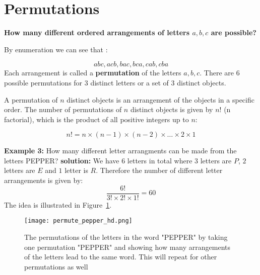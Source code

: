 \section{Permutations}

\textbf{How many different ordered arrangements of letters \(a,b,c\) are possible?}

By enumeration we can see that : 

\[
abc, acb, bac, bca, cab, cba
\]
Each arrangement is called a \textbf{permutation} of the letters \(a,b,c\). There are \(6\) possible permutations for \(3\) distinct letters or a set of \(3\) distinct objects.

\begin{definitionbox}
    A permutation of \(n\) distinct objects is an arrangement of the objects in a specific order. The number of permutations of \(n\) distinct objects is given by \(n!\) (n factorial), which is the product of all positive integers up to \(n\):
    
    \[
    n! = n \times (n-1) \times (n-2) \times \ldots \times 2 \times 1
    \]
\end{definitionbox} 


\begin{examplebox}
    \textbf{Example 3:} How many different letter arrangments can be made from the letters PEPPER?
        \textbf{solution:} We have \(6\) letters in total where \(3\) letters are \(P\), \(2\) letters are \(E\) and \(1\) letter is \(R\). Therefore the number of different letter arrangements is given by:
        \[ \frac{6!}{3! \times 2! \times 1!} = 60 \]
        The idea is illustrated in Figure~\ref{fig:permute_pepper}.
\end{examplebox}

\begin{figure}[H!]
    \centering
    \texttt{[image: permute\_pepper\_hd.png]}
    \caption{The permutations of the letters in the word "PEPPER" by taking one permutation "PEPPER" and showing how many arrangements of the letters lead to the same word. This will repeat for other permutations as well}
    \label{fig:permute_pepper}
\end{figure}


